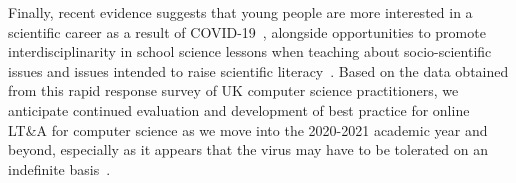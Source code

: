 \documentclass[sigconf]{acmart}
\begin{document}
Finally, recent evidence suggests that young people are more
interested in a scientific career as a result of
COVID-19~\cite{bsasciecareers:2020}, alongside opportunities to
promote interdisciplinarity in school science lessons when teaching
about socio-scientific issues and issues intended to raise scientific
literacy~\cite{reiss:2020}. Based on the data obtained from this rapid
response survey of UK computer science practitioners, we anticipate
continued evaluation and development of best practice for online LT\&A
for computer science as we move into the 2020-2021 academic year and
beyond, especially as it appears that the virus may have to be
tolerated on an indefinite basis~\cite{kissler-et-al:2020}.




\end{document}
